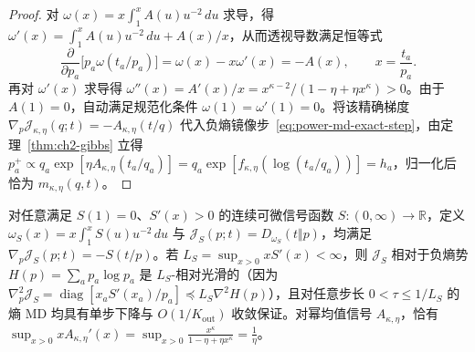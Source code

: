 \documentclass[lang=cn,scheme=chinese,openany]{elegantbook}
\newcommand{\R}{\mathbb R}
\begin{document}
\begin{proof}
对 $\omega(x)=x\int_1^x A(u)u^{-2}\,du$ 求导，得 $\omega'(x)=\int_1^x A(u)u^{-2}\,du+A(x)/x$，从而透视导数满足恒等式
\begin{equation*}
 \frac{\partial}{\partial p_a}\bigl[p_a\omega(t_a/p_a)\bigr]
 =\omega(x)-x\omega'(x)=-A(x),\qquad x=\frac{t_a}{p_a}.
\end{equation*}
再对 $\omega'(x)$ 求导得 $\omega''(x)=A'(x)/x=x^{\kappa-2}/(1-\eta+\eta x^\kappa)>0$。由于 $A(1)=0$，自动满足规范化条件 $\omega(1)=\omega'(1)=0$。将该精确梯度 $\nabla_p\mathcal J_{\kappa,\eta}(q;t)=-A_{\kappa,\eta}(t/q)$ 代入负熵镜像步~\eqref{eq:power-md-exact-step}，由定理~\ref{thm:ch2-gibbs} 立得 $p_a^+\propto q_a\exp[\eta A_{\kappa,\eta}(t_a/q_a)]=q_a\exp[f_{\kappa,\eta}(\log(t_a/q_a))]=h_a$，归一化后恰为 $m_{\kappa,\eta}(q,t)$。
\end{proof}

\begin{proposition}[一般单调概率比信号的可积性与相对光滑框架]
\label{prop:power-general-signal-framework}
对任意满足 $S(1)=0$、$S'(x)>0$ 的连续可微信号函数 $S:(0,\infty)\to\R$，定义 $\omega_S(x)=x\int_1^x S(u)u^{-2}\,du$ 与 $\mathcal J_S(p;t)=D_{\omega_S}(t\Vert p)$，均满足 $\nabla_p\mathcal J_S(p;t)=-S(t/p)$。若 $L_S=\sup_{x>0}x S'(x)<\infty$，则 $\mathcal J_S$ 相对于负熵势 $H(p)=\sum_a p_a\log p_a$ 是 $L_S$-相对光滑的（因为 $\nabla_p^2\mathcal J_S=\operatorname{diag}[x_a S'(x_a)/p_a]\preceq L_S\nabla^2 H(p)$），且对任意步长 $0<\tau\le 1/L_S$ 的熵 MD 均具有单步下降与 $O(1/K_{\mathrm{out}})$ 收敛保证。对幂均值信号 $A_{\kappa,\eta}$，恰有 $\sup_{x>0}x A_{\kappa,\eta}'(x)=\sup_{x>0}\frac{x^\kappa}{1-\eta+\eta x^\kappa}=\frac1\eta$。
\end{proposition}
\end{document}
